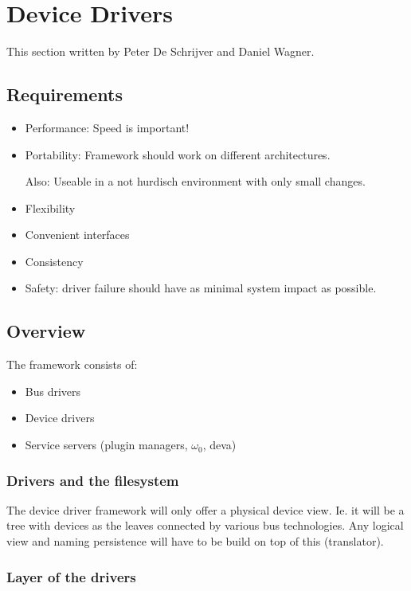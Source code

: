\chapter{Device Drivers}

This section written by Peter De Schrijver and Daniel Wagner.


\section{Requirements}

\begin{itemize}
\item Performance: Speed is important!
\item Portability: Framework should work on different architectures.
    
  Also: Useable in a not hurdisch environment with only
  small changes.

\item Flexibility
\item Convenient interfaces
\item Consistency 
\item Safety: driver failure should have as minimal system impact as
  possible.
\end{itemize}


\section{Overview}

The framework consists of: 
\begin{itemize}
\item Bus drivers
\item Device drivers
\item Service servers (plugin managers, $\omega_0$, deva)
\end{itemize}

\subsection{Drivers and the filesystem}

The device driver framework will only offer a physical device view.
Ie. it will be a tree with devices as the leaves connected by
various bus technologies.  Any logical view and naming persistence
will have to be build on top of this (translator).

\subsection{Layer of the drivers}

